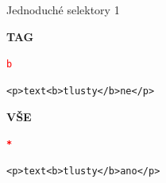 \documentclass[aspectratio=169]{beamer}
\begin{document}

\begin{frame}{Jednoduché selektory 1}
    \begin{multicols}{2}
        \centering

        \begin{cardTiny}
            \begin{center}
                \textbf{TAG}
            \end{center}

            \begin{flushleft}
                \begin{alltt}
                    \textcolor{red}{b} \string{\\
                        \textcolor{blue}{color}: \textcolor{orange}{blue};\\
                    \string}
                \end{alltt}
                \begin{alltt}
                    <p>text <b>tlusty</b> ne</p>
                \end{alltt}
            \end{flushleft}
        \end{cardTiny}
        \begin{cardTiny}
            \begin{center}
                \textbf{VŠE}
            \end{center}

            \begin{flushleft}
                \begin{alltt}
                    \textbf{\textcolor{red}{*}} \string{\\
                        \textcolor{blue}{color}: \textcolor{orange}{purple};\\
                    \string}
                \end{alltt}

                \begin{alltt}
                    <p>text <b>tlusty</b> ano</p>
                \end{alltt}
            \end{flushleft}
        \end{cardTiny}
    \end{multicols}
\end{frame}
\end{document}

